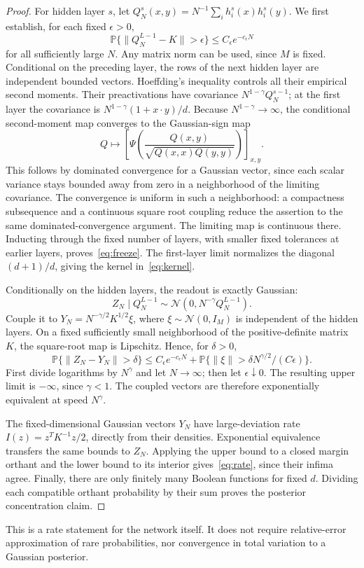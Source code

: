 \begin{proof}
For hidden layer $s$, let
$Q_N^s(x,y)=N^{-1}\sum_i h_i^s(x)h_i^s(y)$.
We first establish, for each fixed $\epsilon>0$,
\begin{equation}\label{eq:freeze}
 \mathbb P\{\|Q_N^{L-1}-K\|>\epsilon\}
       \le C_\epsilon e^{-c_\epsilon N}
\end{equation}
for all sufficiently large $N$. Any matrix norm can be used, since
$M$ is fixed. Conditional on the preceding layer, the rows of the
next hidden layer are independent bounded vectors. Hoeffding's
inequality controls all their empirical second moments. Their
preactivations have covariance $N^{1-\gamma}Q_N^{s-1}$; at the first
layer the covariance is
$N^{1-\gamma}(1+x\cdot y)/d$. Because $N^{1-\gamma}\to\infty$,
the conditional second-moment map converges to the Gaussian-sign map
\[
 Q\longmapsto \left[\Psi\!\left(
 \frac{Q(x,y)}{\sqrt{Q(x,x)Q(y,y)}}\right)\right]_{x,y}.
\]
This follows by dominated convergence for a Gaussian vector, since
each scalar variance stays bounded away from zero in a neighborhood
of the limiting covariance. The convergence is uniform in such a
neighborhood: a compactness subsequence and a continuous square root
coupling reduce the assertion to the same dominated-convergence
argument. The limiting map is continuous there. Inducting through
the fixed number of layers, with smaller fixed tolerances at earlier
layers, proves~\eqref{eq:freeze}. The first-layer limit normalizes
the diagonal $(d+1)/d$, giving the kernel in~\eqref{eq:kernel}.

Conditionally on the hidden layers, the readout is exactly Gaussian:
\begin{equation}\label{eq:readout}
 Z_N\mid Q_N^{L-1}\sim\mathcal N(0,N^{-\gamma}Q_N^{L-1}).
\end{equation}
Couple it to $Y_N=N^{-\gamma/2}K^{1/2}\xi$, where
$\xi\sim\mathcal N(0,I_M)$ is independent of the hidden layers.
On a fixed sufficiently small neighborhood of the positive-definite
matrix $K$, the square-root map is Lipschitz. Hence, for $\delta>0$,
\[
 \mathbb P\{\|Z_N-Y_N\|>\delta\}
 \le C_\epsilon e^{-c_\epsilon N}
 +\mathbb P\{\|\xi\|>\delta N^{\gamma/2}/(C\epsilon)\}.
\]
First divide logarithms by $N^\gamma$ and let $N\to\infty$;
then let $\epsilon\downarrow0$. The resulting upper limit is
$-\infty$, since $\gamma<1$. The coupled vectors are therefore
exponentially equivalent at speed $N^\gamma$.

The fixed-dimensional Gaussian vectors $Y_N$ have large-deviation
rate $I(z)=z^TK^{-1}z/2$, directly from their densities. Exponential
equivalence transfers the same bounds to $Z_N$. Applying the upper
bound to a closed margin orthant and the lower bound to its interior
gives~\eqref{eq:rate}, since their infima agree. Finally, there are
only finitely many Boolean functions for fixed $d$. Dividing each
compatible orthant probability by their sum proves the posterior
concentration claim.
\end{proof}

This is a rate statement for the network itself. It does not require
relative-error approximation of rare probabilities, nor convergence
in total variation to a Gaussian posterior.

